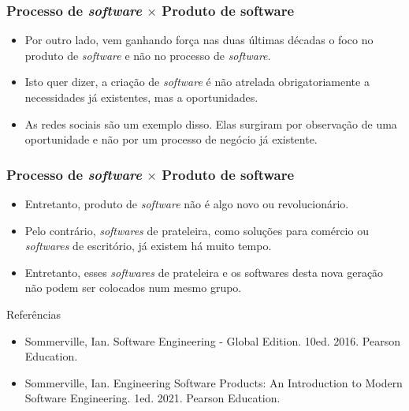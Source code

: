 \documentclass[11pt]{beamer}
\begin{document}
    \begin{frame}
      \frametitle{Processo de \textit{software} $\times$ Produto de software}
      \begin{itemize}
        \item Por outro lado, vem ganhando força nas duas últimas décadas o foco no produto de \textit{software} e não no processo de \textit{software}.
        \item Isto quer dizer, a criação de \textit{software} é não atrelada obrigatoriamente a necessidades já existentes, mas a oportunidades.
        \item As redes sociais são um exemplo disso. Elas surgiram por observação de uma oportunidade e não por um processo de negócio já existente.
      \end{itemize}
    \end{frame}

    \begin{frame}
      \frametitle{Processo de \textit{software} $\times$ Produto de software}
      \begin{itemize}
        \item Entretanto, produto de \textit{software} não é algo novo ou revolucionário.
        \item Pelo contrário, \textit{softwares} de prateleira, como soluções para comércio ou \textit{softwares} de escritório, já existem há muito tempo.
        \item Entretanto, esses \textit{softwares} de prateleira e os softwares desta nova geração não podem ser colocados num mesmo grupo.
      \end{itemize}
    \end{frame}

    \begin{frame}{Referências}
      \begin{itemize}
          \item Sommerville, Ian. Software Engineering - Global Edition. 10ed. 2016. Pearson Education.
          \item Sommerville, Ian. Engineering Software Products: An Introduction to Modern Software Engineering. 1ed. 2021. Pearson Education. 
      \end{itemize}
   \end{frame}
\end{document}
